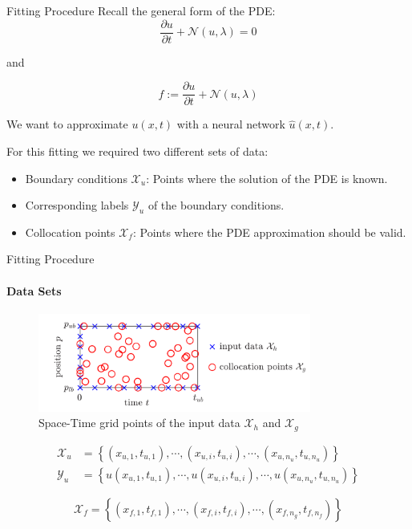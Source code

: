 \begin{frame}{Fitting Procedure}
    Recall the general form of the PDE:
    \begin{equation}
        \frac{\partial u}{\partial t} + \mathcal{N}(u, \lambda) = 0
    \end{equation}

    and 

    \begin{equation}
        f := \frac{\partial u}{\partial t} + \mathcal{N}(u, \lambda)
    \end{equation}

We want to approximate $u(x, t)$ with a neural network $\hat{u}(x, t)$.

For this fitting we required two different sets of data:

\begin{itemize}
    \item Boundary conditions $\mathcal{X}_u$: Points where the solution of the PDE is known.
    \item Corresponding labels $\mathcal{Y}_u$ of the boundary conditions.
    \item Collocation points $\mathcal{X}_f$: Points where the PDE approximation should be valid.
\end{itemize}
\end{frame}

\begin{frame}{Fitting Procedure}
\framesubtitle{Data Sets}

\begin{figure}[H]
    \centering
    \includegraphics[width=0.8\textwidth]{img/space_time_grid.png}
    \caption{Space-Time grid points of the input data $\mathcal{X}_h$ and $\mathcal{X}_g$}
    \label{fig:space_time_grid}
\end{figure}   

\begin{align}
    \mathcal{X}_u &= \left\{
        \left(x_{u,1}, t_{u,1}\right),
        \cdots,
        \left(x_{u,i}, t_{u,i}\right),
        \cdots,
        \left(x_{u,n_u}, t_{u,n_u}\right)
    \right\}\\
    \mathcal{Y}_u &= \left\{
        u\left(x_{u,1}, t_{u,1}\right),
        \cdots,
        u\left(x_{u,i}, t_{u,i}\right),
        \cdots,
        u\left(x_{u,n_u}, t_{u,n_u}\right)
    \right\}
\end{align}

\begin{equation}
    \mathcal{X}_f = \left\{
        \left(x_{f,1}, t_{f,1}\right),
        \cdots,
        \left(x_{f,i}, t_{f,i}\right),
        \cdots,
        \left(x_{f,n_g}, t_{f,n_f}\right)
    \right\}
\end{equation}
\end{frame}

